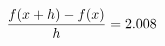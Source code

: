 \documentclass[preview]{standalone}
\begin{document}
\begin{align*}
\special{dvisvgm:raw <g id='unique000'>}\frac{f(x+h)-f(x)}{h} = 2.008\special{dvisvgm:raw </g>}
\end{align*}
\end{document}
